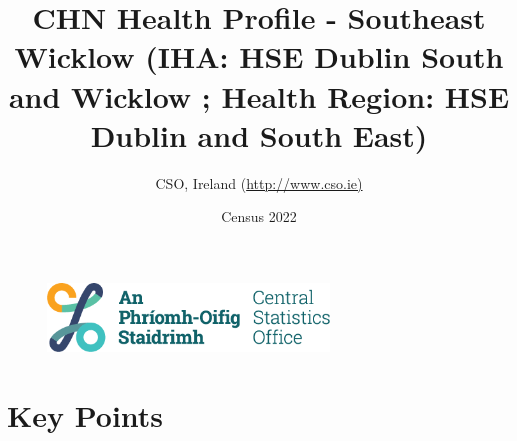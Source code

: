 \documentclass{article}
\title{CHN Health Profile - Southeast Wicklow (IHA: HSE Dublin South and Wicklow ;  Health Region: HSE Dublin and South East) }
\date{Census 2022}
\author{CSO, Ireland  (\url{http://www.cso.ie)}}
\begin{document}


\begin{figure}
	\centering
\includegraphics[width =75mm]{../figures/CSO_Logo.png}
\end{figure}

				 
		   
						  
														  
																																													
												 
			 
\maketitle
					
													   
				 
						 
																																																																											   
				 
				  
  \pagebreak
    	    \tableofcontents

\pagebreak


\section{Key Points}
\end{document}
